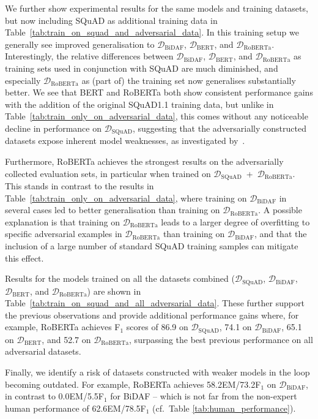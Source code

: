 \documentclass[11pt,a4paper]{article}
\newcommand{\dataset}[1]{\ensuremath{\mathcal{D_{\mathrm{#1}}}}}
\newcommand{\squad}{SQuAD}
\newcommand{\squadone}{SQuAD1.1}
\begin{document}
We further show experimental results for the same models and training datasets, but now including \squad{} as additional training data in Table~\ref{tab:train_on_squad_and_adversarial_data}.
In this training setup we generally see improved generalisation to \dataset{BiDAF}, \dataset{BERT}, and \dataset{RoBERTa}.
Interestingly, the relative differences between \dataset{BiDAF}, \dataset{BERT}, and \dataset{RoBERTa} as training sets used in conjunction with \squad{} are much diminished, and especially \dataset{RoBERTa} as (part of) the training set now generalises substantially better.
We see that BERT and RoBERTa both show consistent performance gains with the addition of the original \squadone{} training data, but unlike in Table~\ref{tab:train_only_on_adversarial_data}, this comes without any noticeable decline in performance on \dataset{SQuAD}, suggesting that the adversarially constructed datasets expose inherent model weaknesses, as investigated by~\citet{liu-etal-2019-inoculation}.


Furthermore, RoBERTa achieves the strongest results on the adversarially collected evaluation sets, in particular when trained on \dataset{SQuAD}~+~\dataset{RoBERTa}.
This stands in contrast to the results in Table~\ref{tab:train_only_on_adversarial_data}, where training on \dataset{BiDAF} in several cases led to better generalisation than training on \dataset{RoBERTa}.
A possible explanation is that training on \dataset{RoBERTa} leads to a larger degree of overfitting to specific adversarial examples in \dataset{RoBERTa} than training on \dataset{BiDAF}, and that the inclusion of a large number of standard \squad{} training samples can mitigate this effect.


Results for the models trained on all the datasets combined (\dataset{SQuAD}, \dataset{BiDAF}, \dataset{BERT}, and \dataset{RoBERTa}) are shown in Table~\ref{tab:train_on_squad_and_all_adversarial_data}.
These further support the previous observations and provide additional performance gains where, for example, RoBERTa achieves F$_\text{1}$ scores of 86.9 on \dataset{SQuAD}, 74.1 on \dataset{BiDAF}, 65.1 on \dataset{BERT}, and 52.7 on \dataset{RoBERTa}, surpassing the best previous performance on all adversarial datasets.


Finally, we identify a risk of datasets constructed with weaker models in the loop becoming outdated. 
For example, RoBERTa achieves 58.2EM/73.2F$_\text{1}$ on \dataset{BiDAF}, in contrast to 0.0EM/5.5F$_\text{1}$ for BiDAF -- which is not far from the non-expert human performance of 62.6EM/78.5F$_\text{1}$ (cf.~Table \ref{tab:human_performance}).
\end{document}
